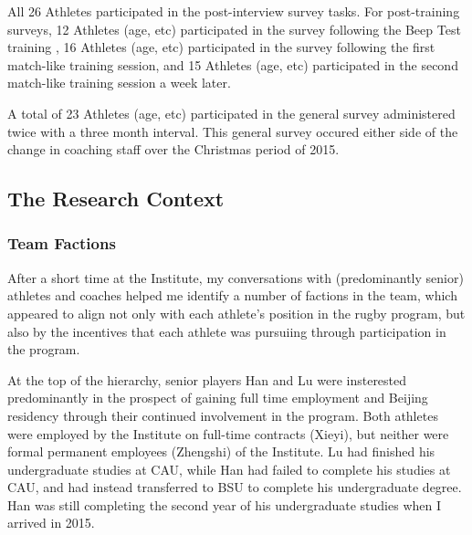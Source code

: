   All 26 Athletes participated in the post-interview survey tasks.  For post-training surveys, 12 Athletes (age, etc) participated in the survey following the Beep Test training , 16 Athletes (age, etc) participated in the survey following the first match-like training session, and 15 Athletes (age, etc) participated in the second match-like training session a week later.

  A total of 23 Athletes (age, etc) participated in the general survey administered twice with a three month interval. This general survey occured either side of the change in coaching staff over the Christmas period of 2015.




\subsection{The Research Context}


\subsubsection{Team Factions}

After a short time at the Institute, my conversations with (predominantly senior) athletes and coaches helped me identify a number of factions in the team, which appeared to align not only with each athlete's position in the rugby program, but also by the incentives that each athlete was pursuiing through participation in the program.

At the top of the hierarchy, senior players Han and Lu were insterested predominantly in the prospect of gaining full time employment and Beijing residency through their continued involvement in the program.  Both athletes were employed by the Institute on full-time contracts (Xieyi), but neither were formal permanent employees (Zhengshi) of the Institute.  Lu had finished his undergraduate studies at CAU, while Han had failed to complete his studies at CAU, and had instead transferred to BSU to complete his undergraduate degree. Han was still completing the second year of his undergraduate studies when I arrived in 2015.

